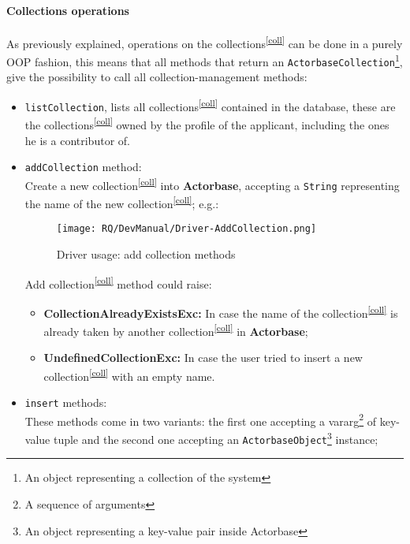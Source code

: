\documentclass{scalatekids-article}
\begin{document}
\paragraph{Collections operations}

As previously explained, operations on the collections\textsuperscript{\ref{coll}} can be done in a purely
OOP fashion, this means that all methods that return an \verb=ActorbaseCollection=\footnote{An object representing a collection of the system\label{ABcoll}},
give the possibility to call all collection-management methods:

\begin{itemize}
\item \verb=listCollection=, lists all collections\textsuperscript{\ref{coll}}
  contained in the database, these are the collections\textsuperscript{\ref{coll}}
  owned by the profile of the applicant, including the ones he is a contributor of.
\item \verb=addCollection= method:\\ Create a new collection\textsuperscript{\ref{coll}} into \textbf{Actorbase}, accepting a \verb=String=
  representing the name of the new collection\textsuperscript{\ref{coll}};
  e.g.:
  \begin{figure}[H]
    \begin{center}
      \texttt{[image: RQ/DevManual/Driver-AddCollection.png]}
      \caption{Driver usage: add collection  methods}
    \end{center}
  \end{figure}
  Add collection\textsuperscript{\ref{coll}} method could raise:
  \begin{itemize}
  \item \textbf{CollectionAlreadyExistsExc:} In case the name of the collection\textsuperscript{\ref{coll}} is already taken by another collection\textsuperscript{\ref{coll}} in \textbf{Actorbase};
  \item \textbf{UndefinedCollectionExc:} In case the user tried to insert a new collection\textsuperscript{\ref{coll}} with an empty name.
  \end{itemize}
\item \verb=insert= methods:\\ These methods come in two variants: the first one accepting
  a vararg\footnote{A sequence of arguments} of key-value tuple and the second
  one accepting an
  \verb=ActorbaseObject=\footnote{An object representing a key-value pair inside Actorbase\label{ABobj}} instance;

\end{itemize}
\end{document}
